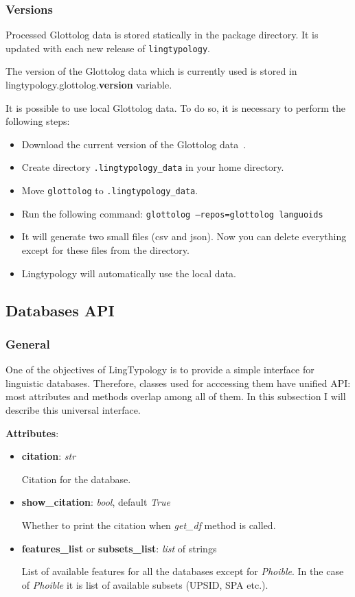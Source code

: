 \documentclass[a4paper,12pt]{article}
\begin{document}
\subsubsection{Versions}

Processed Glottolog data is stored statically in the package directory. It is updated with each new release of \texttt{lingtypology}.

The version of the Glottolog data which is currently used is stored in lingtypology.glottolog.\textbf{version} variable.

It is possible to use local Glottolog data. To do so, it is necessary to perform the following steps:
\begin{itemize}
 \item Download the current version of the Glottolog data~\parencite{HaraldHammarstrom2019}.
 \item Create directory \texttt{.lingtypology\_data} in your home directory.
 \item Move \texttt{glottolog} to \texttt{.lingtypology\_data}.
 \item Run the following command: \texttt{glottolog --repos=glottolog languoids}
 \item It will generate two small files (csv and json). Now you can delete everything except for these files from the directory.
 \item Lingtypology will automatically use the local data.
\end{itemize}

\subsection{Databases API}

\subsubsection{General}

One of the objectives of LingTypology is to provide a simple interface for linguistic databases. Therefore, classes used for acccessing them have unified API: most attributes and methods overlap among all of them. In this subsection I will describe this universal interface.

\textbf{Attributes}:
\begin{itemize}
 \item \textbf{citation}: \textit{str}
 
 Citation for the database.
 
 \item \textbf{show\_citation}: \textit{bool}, default \textit{True}
 
 Whether to print the citation when \textit{get\_df} method is called.
 
 \item \textbf{features\_list} or \textbf{subsets\_list}: \textit{list} of strings
 
 List of available features for all the databases except for \textit{Phoible}. In the case of \textit{Phoible} it is list of available subsets (UPSID, SPA etc.).
\end{itemize}
\end{document}

